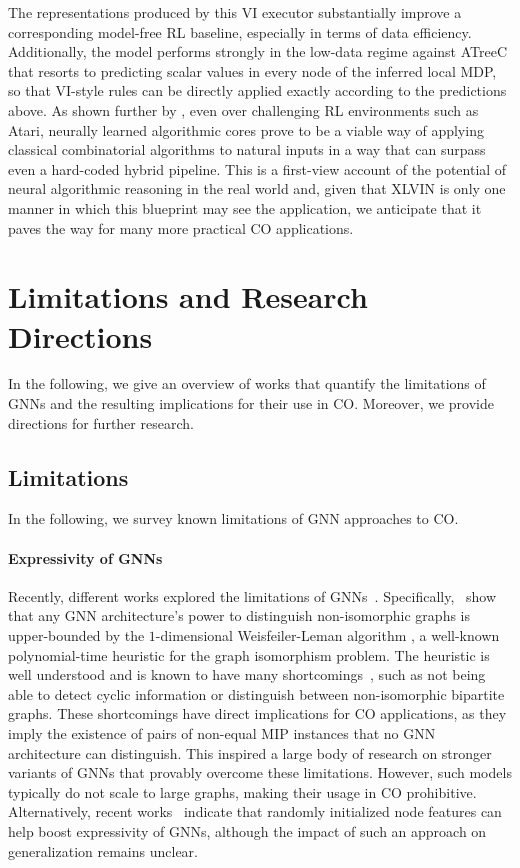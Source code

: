 \documentclass[twoside,11pt]{article}
\begin{document}
The representations produced by this VI executor substantially improve a corresponding model-free RL baseline, especially in terms of data efficiency. Additionally, the model performs strongly in the low-data regime against ATreeC \citep{farquhar2017treeqn} that resorts to predicting scalar values in every node of the inferred local MDP, so that VI-style rules can be directly applied exactly according to the predictions above. As shown further by \citet{Deac2020}, even over challenging RL environments such as Atari, neurally learned algorithmic cores prove to be a viable way of applying classical combinatorial algorithms to natural inputs in a way that can surpass even a hard-coded hybrid pipeline. This is a first-view account of the potential of neural algorithmic reasoning in the real world and, given that XLVIN is only one manner in which this blueprint may see the application, we anticipate that it paves the way for many more practical CO applications.


\section{Limitations and Research Directions}\label{limits}

In the following, we give an overview of works that quantify the limitations of GNNs and the resulting implications for their use in CO. Moreover, we provide directions for further research.

\subsection{Limitations}

In the following, we survey known limitations of GNN approaches to CO.



\paragraph{Expressivity of GNNs}
Recently, different works explored the limitations of GNNs~\citep{Xu2019,Morris2019a}. Specifically,~\citet{Morris2019a} show that any GNN architecture's power to distinguish non-isomorphic graphs is upper-bounded by the $1$-dimensional Weisfeiler-Leman algorithm \citep{weisfeiler1968reduction}, a well-known polynomial-time heuristic for the graph isomorphism problem.  The heuristic is well understood and is known to have many shortcomings~\citep{Arv+2015}, such as not being able to detect cyclic information or distinguish between non-isomorphic bipartite graphs. These shortcomings have direct implications for CO applications, as they imply the existence of pairs of non-equal MIP instances that no GNN architecture can distinguish. This inspired a large body of research on stronger variants of GNNs \citep{Chen2019a,Morris2019a,Maron2019,Maron2019a,Morris2020b,Murphy2019,Murphy2019a} that provably overcome these limitations. However, such models typically do not scale to large graphs, making their usage in CO prohibitive. Alternatively, recent works~\citep{Sato2020a,Abb+2020} indicate that randomly initialized node features can help boost expressivity of GNNs, although the impact of such an approach on generalization remains unclear.
\end{document}
